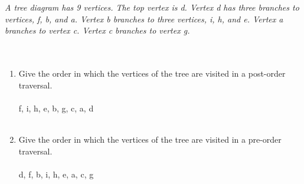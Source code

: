 \documentclass{amsart}
\theoremstyle{definition}
\theoremstyle{Exercise}
\theoremstyle{remark}
\theoremstyle{rule}
\numberwithin{equation}{section}
\begin{document}
\\\\
{\color{blue}{\bf Figure 14:} \emph{A tree diagram has 9 vertices. The top vertex is d. Vertex d has three branches to vertices, f, b, and a. Vertex b branches to three vertices, i, h, and e. Vertex a branches to vertex c. Vertex c branches to vertex g.
\\
}
}
\\
\\
\begin{enumerate}[label=(\alph*)]
\item Give the order in which the vertices of the tree are visited in a post-order traversal.\\\\
f, i, h, e, b, g, c, a, d
\\\\
\item Give the order in which the vertices of the tree are visited in a pre-order traversal.\\\\
d, f, b, i, h, e, a, c, g
\\\\
\end{enumerate}


 \newpage
\end{document}
